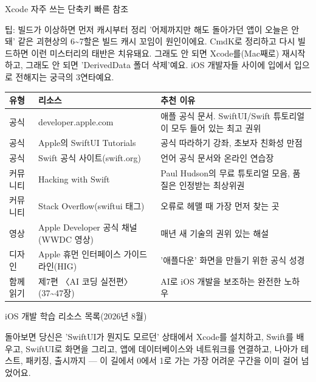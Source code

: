 \begin{center}\small\color{gray}Xcode 자주 쓰는 단축키 빠른 참조\end{center}

\begin{tcbinfo}{팁: 빌드가 이상하면 먼저 캐시부터 정리}
'어제까지만 해도 돌아가던 앱이 오늘은 안 돼' 같은 괴현상의 6\textasciitilde{}7할은 빌드 캐시 꼬임이 원인이에요. CmdK로 정리하고 다시 빌드하면 이런 미스터리의 태반은 치유돼요. 그래도 안 되면 Xcode를(Mac째로) 재시작하고, 그래도 안 되면 'DerivedData 폴더 삭제'예요. iOS 개발자들 사이에 입에서 입으로 전해지는 궁극의 3연타예요.

\end{tcbinfo}



\begin{center}
\begin{tabularx}{\linewidth}{|X|X|X|}
\hline
\textbf{유형} & \textbf{리소스} & \textbf{추천 이유} \tabularnewline
\hline
공식 & developer.apple.com & 애플 공식 문서. SwiftUI/Swift 튜토리얼이 모두 들어 있는 최고 권위 \tabularnewline
공식 & Apple의 SwiftUI Tutorials & 공식 따라하기 강좌, 초보자 친화성 만점 \tabularnewline
공식 & Swift 공식 사이트(swift.org) & 언어 공식 문서와 온라인 연습장 \tabularnewline
커뮤니티 & Hacking with Swift & Paul Hudson의 무료 튜토리얼 모음, 품질은 인정받는 최상위권 \tabularnewline
커뮤니티 & Stack Overflow(swiftui 태그) & 오류로 헤맬 때 가장 먼저 찾는 곳 \tabularnewline
영상 & Apple Developer 공식 채널(WWDC 영상) & 매년 새 기술의 권위 있는 해설 \tabularnewline
디자인 & Apple 휴먼 인터페이스 가이드라인(HIG) & '애플다운' 화면을 만들기 위한 공식 성경 \tabularnewline
함께 읽기 & 제7편 〈AI 코딩 실전편〉(37\textasciitilde{}47장) & AI로 iOS 개발을 보조하는 완전한 노하우 \tabularnewline
\hline
\end{tabularx}
\end{center}

\begin{center}\small\color{gray}iOS 개발 학습 리소스 목록(2026년 8월)\end{center}


돌아보면 당신은 'SwiftUI가 뭔지도 모르던' 상태에서 Xcode를 설치하고, Swift를 배우고, SwiftUI로 화면을 그리고, 앱에 데이터베이스와 네트워크를 연결하고, 나아가 테스트, 패키징, 출시까지 — 이 길에서 0에서 1로 가는 가장 어려운 구간을 이미 걸어 넘었어요.

